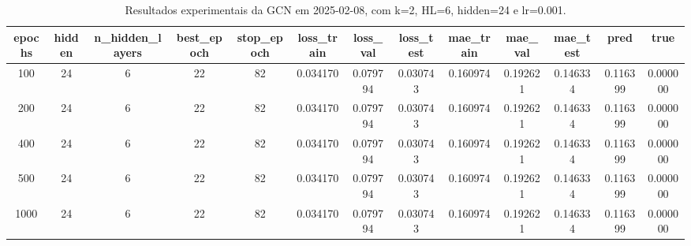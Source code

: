 \begin{table}[h]
\centering
\caption{Resultados experimentais da GCN em 2025-02-08, com k=2, HL=6, hidden=24 e lr=0.001.}
\label{tab:gcn_results_k2_hl6_h24_d20250208}
\begin{tabular}{ccccccccccccc}
\toprule
epochs & hidden & n\_hidden\_layers & best\_epoch & stop\_epoch & loss\_train & loss\_val & loss\_test & mae\_train & mae\_val & mae\_test & pred & true \\
\midrule
100 & 24 & 6 & 22 & 82 & 0.034170 & 0.079794 & 0.030743 & 0.160974 & 0.192621 & 0.146334 & 0.116399 & 0.000000 \\
200 & 24 & 6 & 22 & 82 & 0.034170 & 0.079794 & 0.030743 & 0.160974 & 0.192621 & 0.146334 & 0.116399 & 0.000000 \\
400 & 24 & 6 & 22 & 82 & 0.034170 & 0.079794 & 0.030743 & 0.160974 & 0.192621 & 0.146334 & 0.116399 & 0.000000 \\
500 & 24 & 6 & 22 & 82 & 0.034170 & 0.079794 & 0.030743 & 0.160974 & 0.192621 & 0.146334 & 0.116399 & 0.000000 \\
1000 & 24 & 6 & 22 & 82 & 0.034170 & 0.079794 & 0.030743 & 0.160974 & 0.192621 & 0.146334 & 0.116399 & 0.000000 \\
\bottomrule
\end{tabular}
\end{table}
